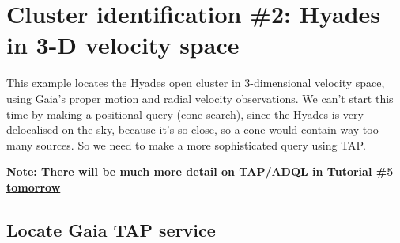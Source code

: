 \documentclass{article}
\begin{document}
\newpage

\section{Cluster identification \#2: Hyades in 3-D velocity space}

This example locates the Hyades open cluster in 3-dimensional velocity space,
using Gaia's proper motion and radial velocity observations.
We can't start this time by making a positional query (cone search),
since the Hyades is very delocalised on the sky, because it's so close,
so a cone would contain way too many sources.
So we need to make a more sophisticated query using TAP.

\begin{center}
  \color{red}\bf
  \underline{Note: There will be much more detail on TAP/ADQL in Tutorial \#5
                   tomorrow}
\end{center}

\subsection{Locate Gaia TAP service}
\end{document}
